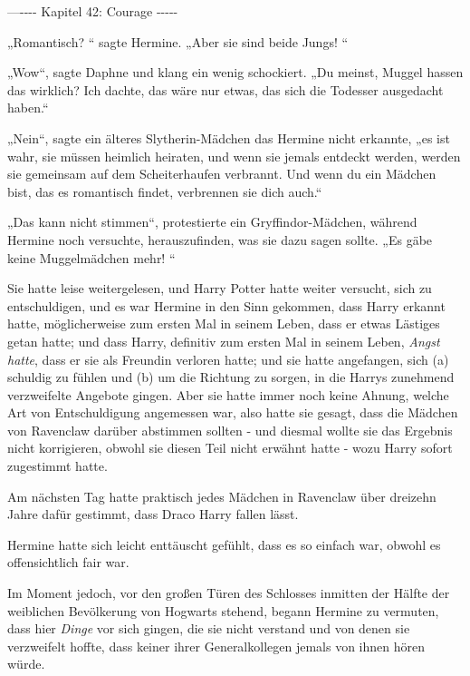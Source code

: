 

\hypertarget{courage}{%

—\/-\/-\/-\/- Kapitel 42: Courage -\/-\/-\/-\/-

„Romantisch? “ sagte Hermine. „Aber sie sind beide Jungs! “

„Wow“, sagte Daphne und klang ein wenig schockiert. „Du meinst, Muggel hassen das wirklich? Ich dachte, das wäre nur etwas, das sich die Todesser ausgedacht haben.“

„Nein“, sagte ein älteres Slytherin-Mädchen das Hermine nicht erkannte, „es ist wahr, sie müssen heimlich heiraten, und wenn sie jemals entdeckt werden, werden sie gemeinsam auf dem Scheiterhaufen verbrannt. Und wenn du ein Mädchen bist, das es romantisch findet, verbrennen sie dich auch.“

„Das kann nicht stimmen“, protestierte ein Gryffindor-Mädchen, während Hermine noch versuchte, herauszufinden, was sie dazu sagen sollte. „Es gäbe keine Muggelmädchen mehr! “

Sie hatte leise weitergelesen, und Harry Potter hatte weiter versucht, sich zu entschuldigen, und es war Hermine in den Sinn gekommen, dass Harry erkannt hatte, möglicherweise zum ersten Mal in seinem Leben, dass er etwas Lästiges getan hatte; und dass Harry, definitiv zum ersten Mal in seinem Leben, \emph{Angst hatte}, dass er sie als Freundin verloren hatte; und sie hatte angefangen, sich (a) schuldig zu fühlen und (b) um die Richtung zu sorgen, in die Harrys zunehmend verzweifelte Angebote gingen. Aber sie hatte immer noch keine Ahnung, welche Art von Entschuldigung angemessen war, also hatte sie gesagt, dass die Mädchen von Ravenclaw darüber abstimmen sollten - und diesmal wollte sie das Ergebnis nicht korrigieren, obwohl sie diesen Teil nicht erwähnt hatte - wozu Harry sofort zugestimmt hatte.

Am nächsten Tag hatte praktisch jedes Mädchen in Ravenclaw über dreizehn Jahre dafür gestimmt, dass Draco Harry fallen lässt.

Hermine hatte sich leicht enttäuscht gefühlt, dass es so einfach war, obwohl es offensichtlich fair war.

Im Moment jedoch, vor den großen Türen des Schlosses inmitten der Hälfte der weiblichen Bevölkerung von Hogwarts stehend, begann Hermine zu vermuten, dass hier \emph{Dinge} vor sich gingen, die sie nicht verstand und von denen sie verzweifelt hoffte, dass keiner ihrer Generalkollegen jemals von ihnen hören würde.

}
